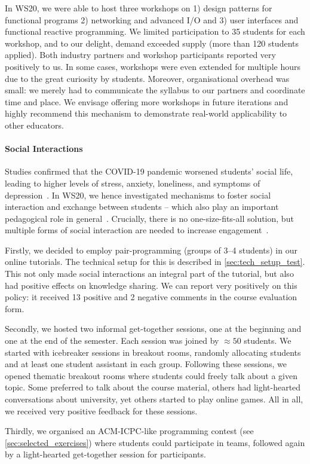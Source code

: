 In WS20,
we were able to host three workshops on 1) design patterns
for functional programs 2) networking and advanced I/O and 3) user interfaces and functional reactive programming.
We limited participation to 35 students for each workshop,
and to our delight, demand exceeded supply (more than 120 students applied).
Both industry partners and workshop participants
reported very positively to us.
In some cases,
workshops were even extended for multiple hours due to the great curiosity by students.
Moreover, organisational overhead was small:
we merely had to communicate the syllabus to our partners and coordinate time and place.
We envisage offering more workshops in future iterations and highly recommend this mechanism to demonstrate real-world applicability to other educators.

\paragraph{Social Interactions}
Studies confirmed that the COVID-19 pandemic
worsened students' social life,
leading to higher levels of stress, anxiety, loneliness, and symptoms of depression~\cite{students_lockdown1}.
In WS20,
we hence investigated mechanisms
to foster social interaction and exchange between students
-- which also play an important pedagogical role in general~\cite{impact_social_interaction}.
Crucially,
there is no one-size-fits-all solution,
but multiple forms of social interaction
are needed to increase engagement~\cite{onlineengagement3,onlineengagement2}.

Firstly, we decided to employ pair-programming (groups of 3--4 students)
in our online tutorials.
The technical setup for this is described in \cref{sec:tech_setup_test}.
This not only made social interactions an integral part of the tutorial,
but also had positive effects on knowledge sharing.
We can report very positively on this policy:
it received 13 positive and 2 negative comments in the course evaluation form.

Secondly, we hosted two informal get-together sessions,
one at the beginning and one at the end of the semester.
Each session was joined by $\approx 50$ students.
We started with icebreaker sessions in breakout rooms,
randomly allocating students and at least one student assistant in each group.
Following these sessions,
we opened thematic breakout rooms where students
could freely talk about a given topic.
Some preferred to talk about the course material, others had
light-hearted conversations about university, yet others started to play online games.
All in all, we received very positive feedback for these sessions.

Thirdly, we organised an
ACM-ICPC-like programming contest (see \cref{sec:selected_exercises})
where students could participate in teams,
followed again by a light-hearted get-together session
for participants.

